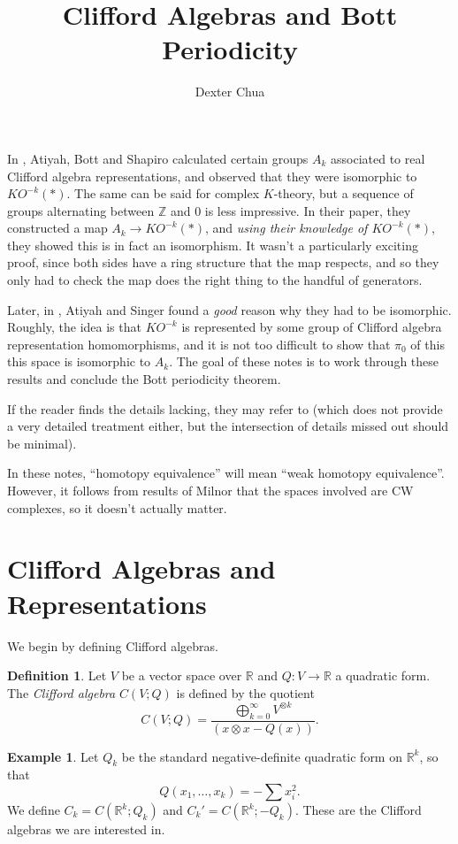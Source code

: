 \documentclass{shortart}
\title{Clifford Algebras and Bott Periodicity}
\author{Dexter Chua}
\theoremstyle{definition}
\newtheorem*{defi}{Definition}
\newtheorem*{eg}{Example}
\newcommand\R{\mathbb{R}}
\newcommand\Z{\mathbb{Z}}
\begin{document}
In \cite{abs1964}, Atiyah, Bott and Shapiro calculated certain groups $A_k$ associated to real Clifford algebra representations, and observed that they were isomorphic to $KO^{-k}(*)$. The same can be said for complex $K$-theory, but a sequence of groups alternating between $\Z$ and $0$ is less impressive. In their paper, they constructed a map $A_k \to KO^{-k}(*)$, and \emph{using their knowledge of $KO^{-k}(*)$}, they showed this is in fact an isomorphism. It wasn't a particularly exciting proof, since both sides have a ring structure that the map respects, and so they only had to check the map does the right thing to the handful of generators.

Later, in \cite{atiyahsinger1969}, Atiyah and Singer found a \emph{good} reason why they had to be isomorphic. Roughly, the idea is that $KO^{-k}$ is represented by some group of Clifford algebra representation homomorphisms, and it is not too difficult to show that $\pi_0$ of this this space is isomorphic to $A_k$. The goal of these notes is to work through these results and conclude the Bott periodicity theorem.

If the reader finds the details lacking, they may refer to \cite{atiyahsinger1969} (which does not provide a very detailed treatment either, but the intersection of details missed out should be minimal).

In these notes, ``homotopy equivalence'' will mean ``weak homotopy equivalence''. However, it follows from results of Milnor \cite{milnor1959} that the spaces involved are CW complexes, so it doesn't actually matter.
\section{Clifford Algebras and Representations}
We begin by defining Clifford algebras.

\begin{defi}
  Let $V$ be a vector space over $\R$ and $Q: V \to \R$ a quadratic form. The \emph{Clifford algebra} $C(V; Q)$ is defined by the quotient
  \[
    C(V; Q) = \frac{\bigoplus_{k = 0}^\infty V^{\otimes k}}{(x \otimes x - Q(x))}.
  \]
\end{defi}

\begin{eg}
  Let $Q_k$ be the standard negative-definite quadratic form on $\R^k$, so that
  \[
    Q(x_1, \ldots, x_k) = - \sum x_i^2.
  \]
  We define $C_k = C(\R^k; Q_k)$ and $C_k' = C(\R^k; -Q_k)$. These are the Clifford algebras we are interested in.
\end{eg}
\end{document}
